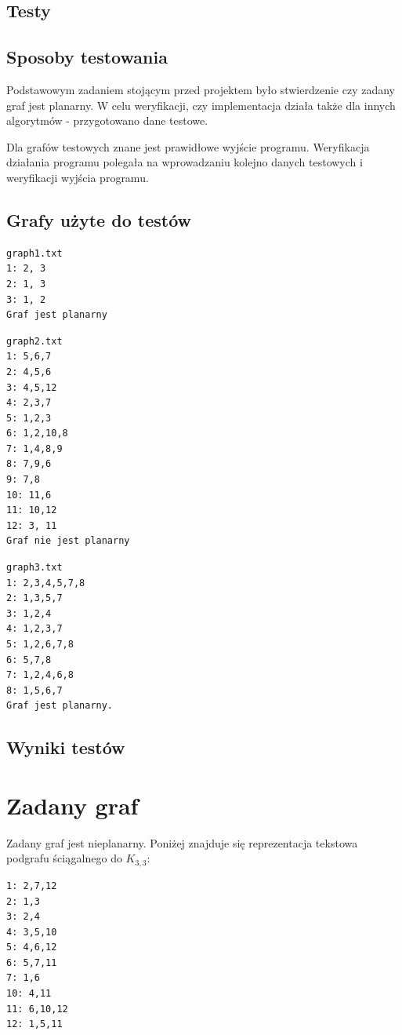 \documentclass[a4 122pt]{article}
\begin{document}
\subsection{Testy}

	\subsection{Sposoby testowania}

		Podstawowym zadaniem stojącym przed projektem było stwierdzenie czy zadany graf jest planarny.
		W celu weryfikacji, czy implementacja działa także dla innych algorytmów - przygotowano dane testowe.
		
		Dla grafów testowych znane jest prawidłowe wyjście programu. Weryfikacja działania programu polegała na wprowadzaniu kolejno danych testowych i weryfikacji wyjścia programu.		

	\subsection{Grafy użyte do testów}

\begin{verbatim}
graph1.txt
1: 2, 3
2: 1, 3
3: 1, 2
Graf jest planarny
\end{verbatim}

\begin{verbatim}
graph2.txt
1: 5,6,7
2: 4,5,6
3: 4,5,12
4: 2,3,7
5: 1,2,3
6: 1,2,10,8
7: 1,4,8,9
8: 7,9,6
9: 7,8
10: 11,6
11: 10,12
12: 3, 11
Graf nie jest planarny
\end{verbatim}

\begin{verbatim}
graph3.txt
1: 2,3,4,5,7,8
2: 1,3,5,7
3: 1,2,4
4: 1,2,3,7
5: 1,2,6,7,8
6: 5,7,8
7: 1,2,4,6,8
8: 1,5,6,7
Graf jest planarny.
\end{verbatim}
	\subsection{Wyniki testów}

	
\section{Zadany graf}

Zadany graf jest nieplanarny. Poniżej znajduje się reprezentacja tekstowa podgrafu ściągalnego do $K_{3,3}$:
\begin{verbatim}
1: 2,7,12
2: 1,3
3: 2,4
4: 3,5,10
5: 4,6,12
6: 5,7,11
7: 1,6
10: 4,11
11: 6,10,12
12: 1,5,11
\end{verbatim}
\end{document}
